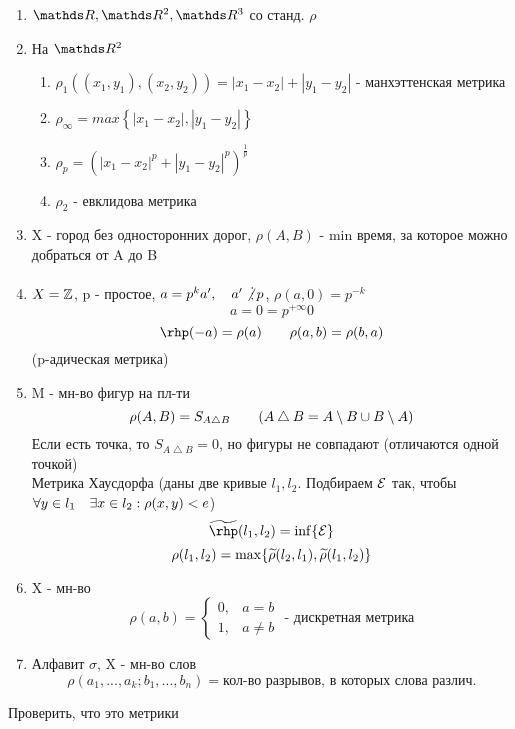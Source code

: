 \documentclass[geometry.tex]{subfiles}
\begin{document}
  \begin{examples}
      \begin{enumerate}
          \item $\R, \R^2, \R^3$ со станд. $\rho$
          \item На $\R^2$
          \begin{enumerate}
              \item $\rho_1((x_1, y_1), (x_2, y_2)) = |x_1 - x_2| + |y_1 - y_2|$ - манхэттенская метрика
              \item $\rho_\infty = max\left\{|x_1 - x_2|, |y_1 - y_2|\right\}$
              \item $\rho_p = (|x_1 - x_2|^p + |y_1 - y_2|^p)^{\frac{1}{p}}$
              \item $\rho_2 \text{ - евклидова метрика}$
          \end{enumerate}
          \item X - город без односторонних дорог, $\rho(A, B)$ - min время, за которое можно добраться от A до B
          \item $X = \mathbb{Z}$, p - простое, $a = p^k a', \q a' \not \devides p$, $\rho(a, 0) = p^{-k}$
          \[a = 0 = p^{+\infty} 0\]
          \[\rhp(-a) = \rho(a) \qq \rho(a,b) = \rho(b,a)\]
          (p-адическая метрика)
          \item M - мн-во фигур на пл-ти
          \[\rho(A, B) = S_{A \bigtriangleup B} \qquad (A \bigtriangleup B = A\setminus B \cup B \setminus A)\]
          Если есть точка, то $S_{A \bigtriangleup B} = 0$, но фигуры не совпадают (отличаются одной точкой)\\
          Метрика Хаусдорфа (даны две кривые $l_1, l_2$. Подбираем $\mathcal{E}$ так, чтобы $\forall y \in l_1 \quad \exists x \in l_2: \rho(x,y)< e$)
          \[\w{\rhp}(l_1, l_2) = \inf\{\E\}\]
          \[\rho(l_1, l_2) = \max\{\widetilde{\rho}(l_2,l_1), \widetilde{\rho}(l_1,l_2)\}\]
          \item X - мн-во\\
              \[\rho(a, b) =
              \begin{cases}
                  0, &a = b\\
                  1, &a \neq b
              \end{cases}\text{ - дискретная метрика}\]
          \item Алфавит $\sigma$, X - мн-во слов
          \[\rho(a_1,...,a_k;b_1,...,b_n) = \text{кол-во разрывов, в которых слова различ.}\]
      \end{enumerate}
  \end{examples}

  \begin{upr}
    Проверить, что это метрики
  \end{upr}
\end{document}
